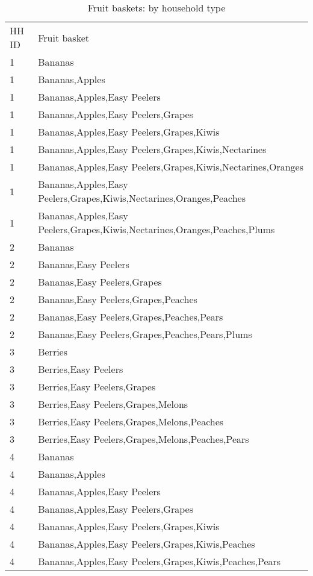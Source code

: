 \documentclass[11pt]{article}
\begin{document}
\begin{table}[h]
\caption{Fruit baskets: by household type}
\label{table:fruit baskets}
\begin{center}
\tiny
\begin{tabular}{ll}
\hline \hline
HH ID & Fruit basket \\
1 & Bananas \\
1 & Bananas,Apples \\
1 & Bananas,Apples,Easy Peelers \\
1 & Bananas,Apples,Easy Peelers,Grapes \\
1 & Bananas,Apples,Easy Peelers,Grapes,Kiwis \\
1 & Bananas,Apples,Easy Peelers,Grapes,Kiwis,Nectarines \\
1 & Bananas,Apples,Easy Peelers,Grapes,Kiwis,Nectarines,Oranges \\
1 & Bananas,Apples,Easy Peelers,Grapes,Kiwis,Nectarines,Oranges,Peaches \\
1 & Bananas,Apples,Easy Peelers,Grapes,Kiwis,Nectarines,Oranges,Peaches,Plums \\
2 & Bananas \\
2 & Bananas,Easy Peelers \\
2 & Bananas,Easy Peelers,Grapes \\
2 & Bananas,Easy Peelers,Grapes,Peaches \\
2 & Bananas,Easy Peelers,Grapes,Peaches,Pears \\
2 & Bananas,Easy Peelers,Grapes,Peaches,Pears,Plums \\
3 & Berries \\
3 & Berries,Easy Peelers \\
3 & Berries,Easy Peelers,Grapes \\
3 & Berries,Easy Peelers,Grapes,Melons \\
3 & Berries,Easy Peelers,Grapes,Melons,Peaches \\
3 & Berries,Easy Peelers,Grapes,Melons,Peaches,Pears \\
4 & Bananas \\
4 & Bananas,Apples \\
4 & Bananas,Apples,Easy Peelers \\
4 & Bananas,Apples,Easy Peelers,Grapes \\
4 & Bananas,Apples,Easy Peelers,Grapes,Kiwis \\
4 & Bananas,Apples,Easy Peelers,Grapes,Kiwis,Peaches \\
4 & Bananas,Apples,Easy Peelers,Grapes,Kiwis,Peaches,Pears \\

\end{tabular}
\end{center}
\end{table}
\end{document}
